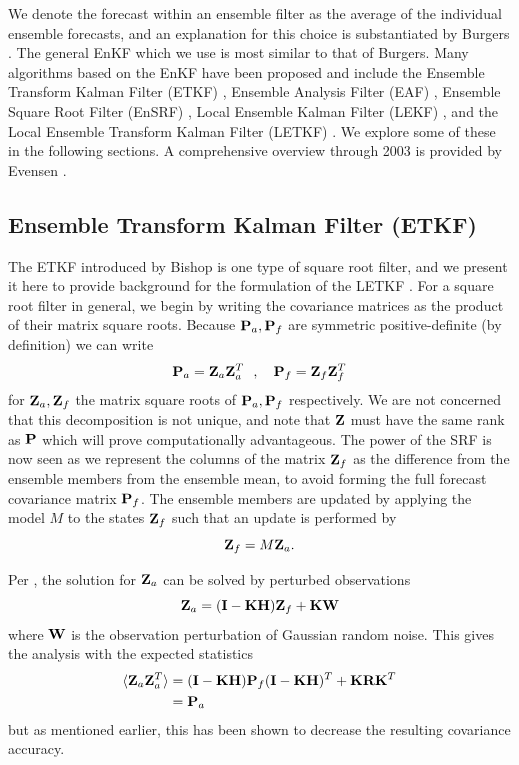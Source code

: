 \documentclass[12pt]{report}
\begin{document}
We denote the forecast within an ensemble filter as the average of the individual ensemble forecasts, and an explanation for this choice is substantiated by Burgers .
The general EnKF which we use is most similar to that of Burgers.
Many algorithms based on the EnKF have been proposed and include the Ensemble Transform Kalman Filter (ETKF) , Ensemble Analysis Filter (EAF) , Ensemble Square Root Filter (EnSRF) , Local Ensemble Kalman Filter (LEKF) , and the Local Ensemble Transform Kalman Filter (LETKF) .
We explore some of these in the following sections.
A comprehensive overview through 2003 is provided by Evensen .

\subsection{Ensemble Transform Kalman Filter (ETKF)}

The ETKF introduced by Bishop is one type of square root filter, and we present it here to provide background for the formulation of the LETKF .
For a square root filter in general, we begin by writing the covariance matrices as the product of their matrix square roots.
Because $\mathbf{P}_a,\mathbf{P}_f$ are symmetric positive-definite (by definition) we can write
\begin{equation} \mathbf{P}_a = \mathbf{Z}_a \mathbf{Z}_a^T ~~,~~~ \mathbf{P}_f = \mathbf{Z}_f \mathbf{Z}_f^T \end{equation}
for $\mathbf{Z}_a,\mathbf{Z}_f$ the matrix square roots of $\mathbf{P}_a,\mathbf{P}_f$ respectively.
We are not concerned that this decomposition is not unique, and note that $\mathbf{Z}$ must have the same rank as $\mathbf{P}$ which will prove computationally advantageous.
The power of the SRF is now seen as we represent the columns of the matrix $\mathbf{Z}_f$ as the difference from the ensemble members from the ensemble mean, to avoid forming the full forecast covariance matrix $\mathbf{P}_f$.
The ensemble members are updated by applying the model $M$ to the states $\mathbf{Z}_f$ such that an update is performed by
\begin{equation} \mathbf{Z}_f = M \mathbf{Z}_a .\end{equation}

Per , the solution for $\mathbf{Z}_a$ can be solved by perturbed observations
\begin{equation} \mathbf{Z}_a = (\mathbf{I} -\mathbf{K} \mathbf{H} ) \mathbf{Z} _f + \mathbf{K} \mathbf{W} \end{equation}
where $\mathbf{W}$ is the observation perturbation of Gaussian random noise.
This gives the analysis with the expected statistics
\begin{align} \langle \mathbf{Z}_a \mathbf{Z}_a^T \rangle &= (\mathbf{I}-\mathbf{K}\mathbf{H})\mathbf{P}_f(\mathbf{I}-\mathbf{K}\mathbf{H})^T + \mathbf{K}\mathbf{R}\mathbf{K}^T\\
&=\mathbf{P}_a \end{align}
but as mentioned earlier, this has been shown to decrease the resulting covariance accuracy.
\end{document}
